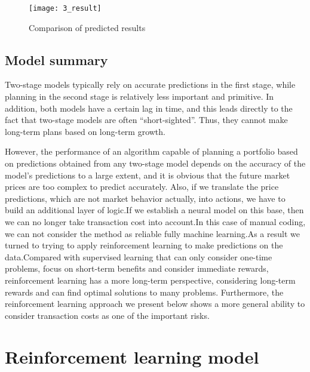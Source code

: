\documentclass{mcmthesis}
\begin{document}
\begin{figure}[h]
  \centering
  \texttt{[image: 3\_result]}
  \caption{Comparison of predicted results}
  \label{fig:prediction}
\end{figure}
\subsection{Model summary}


Two-stage models typically rely on accurate predictions in the first stage, while planning in the second stage is relatively less important and primitive. In addition, both models have a certain lag in time, and this leads directly to the fact that two-stage models are often ``short-sighted''. Thus, they cannot make long-term plans based on long-term growth.

However, the performance of an algorithm capable of planning a portfolio based on predictions obtained from any two-stage model depends on the accuracy of the model's predictions to a large extent, and it is obvious that the future market prices are too complex to predict accurately. Also, if we translate the price predictions, which are not market behavior actually, into actions, we have to build an additional layer of logic.If we establish a neural model on this base, then we can no longer take transaction cost into account.In this case of manual coding, we can not consider the method as reliable fully machine learning.As a result we turned to trying to apply reinforcement learning to make predictions on the data.Compared with supervised learning that can only consider one-time problems, focus on short-term benefits and consider immediate rewards, reinforcement learning has a more long-term perspective, considering long-term rewards and can find optimal solutions to many problems. Furthermore, the reinforcement learning approach we present below shows a more general ability to consider transaction costs as one of the important risks.




\section{Reinforcement learning model}
\end{document}
